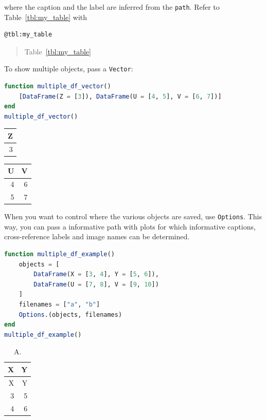 \documentclass[
  notoc %
]{tufte-book}
\newcommand{\passthrough}[1]{#1}
\begin{document}
where the caption and the label are inferred from the
\passthrough{\lstinline!path!}. Refer to Table~\ref{tbl:my_table} with

\begin{lstlisting}
@tbl:my_table
\end{lstlisting}

\begin{quote}
Table~\ref{tbl:my_table}
\end{quote}

To show multiple objects, pass a \passthrough{\lstinline!Vector!}:

\begin{lstlisting}[language=Julia]
function multiple_df_vector()
    [DataFrame(Z = [3]), DataFrame(U = [4, 5], V = [6, 7])]
end
multiple_df_vector()
\end{lstlisting}

\begin{longtable}[]{@{}r@{}}
\toprule
Z \\
\midrule
\endhead
3 \\
\bottomrule
\end{longtable}

\begin{longtable}[]{@{}rr@{}}
\toprule
U & V \\
\midrule
\endhead
4 & 6 \\
5 & 7 \\
\bottomrule
\end{longtable}

When you want to control where the various objects are saved, use
\passthrough{\lstinline!Options!}. This way, you can pass a informative
path with plots for which informative captions, cross-reference labels
and image names can be determined.

\begin{lstlisting}[language=Julia]
function multiple_df_example()
    objects = [
        DataFrame(X = [3, 4], Y = [5, 6]),
        DataFrame(U = [7, 8], V = [9, 10])
    ]
    filenames = ["a", "b"]
    Options.(objects, filenames)
end
multiple_df_example()
\end{lstlisting}

\hypertarget{tbl:a}{}
\begin{longtable}[]{@{}rr@{}}
\caption{\label{tbl:a}A.}\tabularnewline
\toprule
X & Y \\
\midrule
\endfirsthead
\toprule
X & Y \\
\midrule
\endhead
3 & 5 \\
4 & 6 \\
\bottomrule
\end{longtable}
\end{document}
